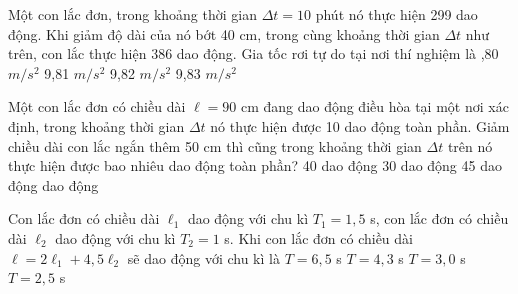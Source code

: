 \begin{vidu}%
Một con lắc đơn, trong khoảng thời gian $\Delta t = 10$ phút nó thực hiện 299 dao động. Khi giảm độ dài của nó bớt 40 cm, trong cùng khoảng thời gian $\Delta t$ như trên, con lắc thực hiện 386 dao động. Gia tốc rơi tự do tại nơi thí nghiệm là
\choice
{,80 $m/s^2$}
{9,81 $m/s^2$}
{9,82 $m/s^2$}
{9,83 $m/s^2$}
\end{vidu} %
\begin{vidu}%
Một con lắc đơn có chiều dài $\ell  = 90$ cm đang dao động điều hòa tại một nơi xác định, trong khoảng thời gian  $\Delta t$  nó thực hiện được 10 dao động toàn phần. Giảm chiều dài con lắc ngắn thêm 50 cm thì cũng trong khoảng thời gian  $\Delta t$  trên nó thực hiện được bao nhiêu dao động toàn phần? 
\choice
{40 dao động}
{30 dao động}
{45 dao động}
{ dao động}
\end{vidu} %
\begin{vidu}%
Con lắc đơn có chiều dài $\ell_1$ dao động với chu kì $T_1 = 1,5$  s, con lắc đơn có chiều dài $\ell_2$ dao động với chu kì $T_2 = 1$  s. Khi con lắc đơn có chiều dài $\ell  = 2\ell_1 + 4,5\ell_2$ sẽ dao động với chu kì là
\choice
{$T = 6,5$ s}
{$T = 4,3$ s}
{\True $T = 3,0$ s}
{$T = 2,5$  s}
\end{vidu} %
